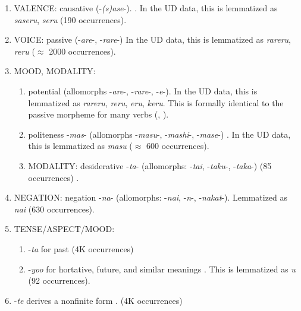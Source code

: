 \documentclass[11pt,letterpaper]{article}
\begin{document}
\begin{enumerate}
\item VALENCE: causative (-\textit{(s)ase}-). \cite[142]{hasegawa2014japanese} \cite[Chapter 13]{kaiser2013japanese}. In the UD data, this is lemmatized as \textit{saseru}, \textit{seru} (190 occurrences).
\item VOICE: passive (-\textit{are}-, -\textit{rare}-) \cite[152]{hasegawa2014japanese} \cite[Chapter 12]{kaiser2013japanese}  In the UD data, this is lemmatized as \textit{rareru}, \textit{reru} ($\approx$ 2000 occurrences).
\item MOOD, MODALITY:
\begin{enumerate}
\item potential (allomorphs -\textit{are}-, -\textit{rare}-, -\textit{e}-). In the UD data, this is lemmatized as \textit{rareru}, \textit{reru}, \textit{eru}, \textit{keru}.
This is formally identical to the passive morpheme for many verbs (\cite[346]{vaccari1938complete}, \cite[398]{kaiser2013japanese}).



\item politeness -\textit{mas}- (allomorphs -\textit{masu}-, -\textit{mashi}-, -\textit{mase}-) \cite[190]{kaiser2013japanese}. %
In the UD data, this is lemmatized as \textit{masu} ($\approx$ 600 occurrences).
\item MODALITY: desiderative -\textit{ta}- (allomorphs: -\textit{tai}, -\textit{taku}-, -\textit{taka}-) (85 occurrences) \cite[238]{kaiser2013japanese}. %
\end{enumerate}
\item NEGATION: negation -\textit{na}- (allomorphs: -\textit{nai}, -\textit{n}-, -\textit{nakat}-). 
Lemmatized as \textit{nai} (630 occurrences).
\item TENSE/ASPECT/MOOD:
\begin{enumerate}
\item -\textit{ta} for past (4K occurrences) \cite[211]{kaiser2013japanese}
\item -\textit{yoo} for hortative, future, and similar meanings \cite[229]{kaiser2013japanese}. This is lemmatized as \textit{u} (92 occurrences).
\end{enumerate}
\item -\textit{te} derives a nonfinite form \cite[186]{kaiser2013japanese}. (4K occurrences)
\end{enumerate}
\end{document}
